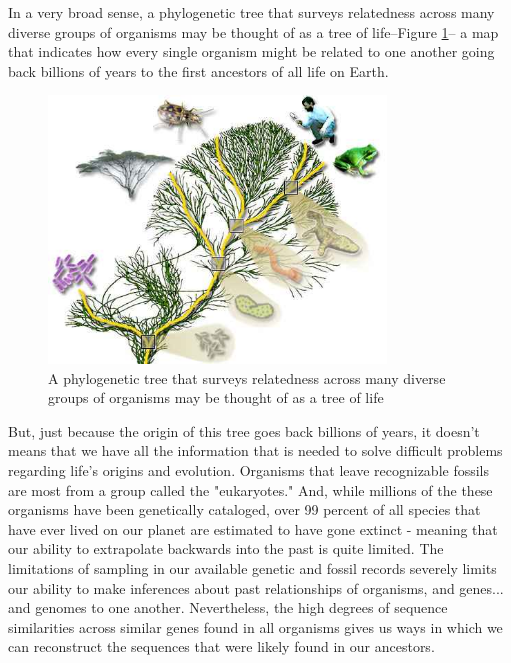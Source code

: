 \documentclass[]{article}
\begin{document}
In a very broad sense,
a phylogenetic tree
that surveys relatedness
across many diverse groups
of organisms
may be thought of as a tree of life--Figure \ref{fig:TOL-5-3}--
a map that indicates
how every single organism
might be related to one another
going back billions of years to
the first ancestors of all life on Earth.

\begin{figure}[H]
	\begin{center}
		\caption[A phylogenetic tree may be thought of as a tree of life]{A phylogenetic tree that surveys relatedness across many diverse groups
			of organisms may be thought of as a tree of life}\label{fig:TOL-5-3}
		\includegraphics[width=0.8\textwidth]{TOL-5-3}
	\end{center}
\end{figure}


But, just because the origin of this tree
goes back billions of years,
it doesn't means that we have
all the information that is needed
to solve difficult problems
regarding life's origins and evolution.
Organisms that leave
recognizable fossils
are most from a group
called the "eukaryotes."
And, while millions of the these organisms
have been genetically cataloged,
over 99 percent of all species
that have ever lived on our planet
are estimated to have gone extinct -
meaning that our ability to extrapolate
backwards into the past is quite limited.
The limitations of sampling in our
available genetic and fossil records
severely limits our ability
to make inferences
about past relationships of organisms,
and genes... and genomes
to one another.
Nevertheless, the high degrees
of sequence similarities
across similar genes
found in all organisms
gives us ways in which we can
reconstruct the sequences
that were likely found in our ancestors.
\end{document}
